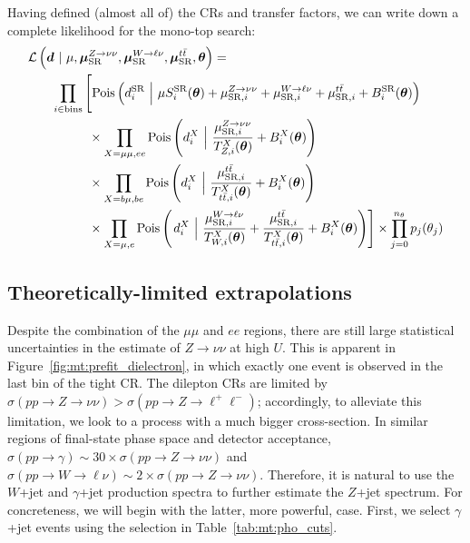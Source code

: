 Having defined (almost all of) the CRs and transfer factors, we can write down a complete likelihood for the mono-top search:
\begin{align}
    \mathcal{L}\left(\bm{d}~|~ \mu,\muz,\muw,\mut,\bm{\theta}\right) = \hspace{-40mm} & \nonumber \\
    \prod_{i\in\mathrm{bins}} & \left[
    \pois\left(d^{\mathrm{SR}}_{i} ~\Big|~ \mu S^{\mathrm{SR}}_{i}(\bm\theta)  + \muzi + \muwi + \muti + B^{\mathrm{SR}}_{i}(\bm\theta)\right) \vphantom{\frac{\muzi}{\Ti{\mu\mu}{Z}(\bm\theta)}}\right. \nonumber \\
    & \phantom{\Big[} \times \prod_{X=\mu\mu,ee} \pois\left(d^{X}_i~\Big|~ \frac{\muzi}{\Ti{X}{Z}(\bm\theta)} + B^{X}_i(\bm\theta) \right) \nonumber \\
    & \phantom{\Big[} \times \prod_{X=b\mu,be}\pois\left(d^{X}_i~\Big|~ \frac{\muti}{\Ti{X}{\ttbar}(\bm\theta)} + B^{X}_i(\bm\theta) \right) \nonumber \\
    & \phantom{\Big[} \times \prod_{X=\mu,e} \pois\left(\left.d^{X}_i~\Big|~ \frac{\muwi}{\Ti{X}{W}(\bm\theta)} + \frac{\muti}{\Ti{X}{\ttbar}(\bm\theta)} + B^{X}_i(\bm\theta) \right) \right]  \times  \prod_{j=0}^{n_\theta} p_j(\theta_j)
\end{align}

\subsection{Theoretically-limited extrapolations}
\label{sec:mt:smtheory}

Despite the combination of the $\mu\mu$ and $ee$ regions, there are still large statistical uncertainties in the estimate of $Z\rightarrow\nu\nu$ at high $U$.
This is apparent in Figure~\ref{fig:mt:prefit_dielectron}, in which exactly one event is observed in the last bin of the tight CR.
The dilepton CRs are limited by $\sigma(pp\rightarrow Z\rightarrow\nu\nu) > \sigma(pp\rightarrow Z\rightarrow\ell^+\ell^-)$; accordingly, to alleviate this limitation, we look to a process with a much bigger cross-section.
In similar regions of final-state phase space and detector acceptance, $\sigma(pp\rightarrow\gamma) \sim 30 \times \sigma(pp\rightarrow Z\rightarrow\nu\nu)$ and $\sigma(pp\rightarrow W\rightarrow\ell\nu) \sim 2\times\sigma(pp\rightarrow Z\rightarrow\nu\nu)$.
Therefore, it is natural to use the $W$+jet and $\gamma$+jet production spectra to further estimate the $Z$+jet spectrum.
For concreteness, we will begin with the latter, more powerful, case.
First, we select $\gamma$+jet events using the selection in Table~\ref{tab:mt:pho_cuts}.

